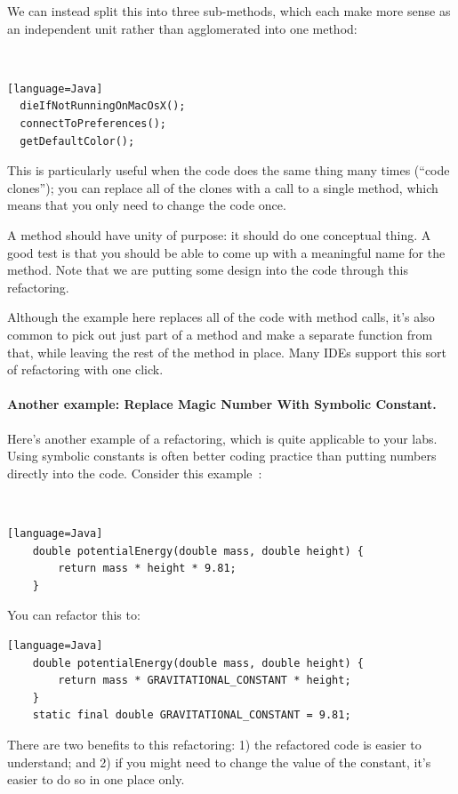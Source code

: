 We can instead split this into three sub-methods, which each make more
sense as an independent unit rather than agglomerated into one method:

{\tt
\begin{verbatim}[language=Java]
  dieIfNotRunningOnMacOsX();
  connectToPreferences();
  getDefaultColor();
\end{verbatim}
}

This is particularly useful when the code does the same thing 
many times (``code clones''); you can replace all of the clones with
a call to a single method, which means that you only need to change the
code once. 

A method should have unity of purpose: it should do one
conceptual thing. A good test is that you should be able to come up
with a meaningful name for the method. Note that we are putting some
design into the code through this refactoring.

Although the example here replaces all of the code with method calls,
it's also common to pick out just part of a method and make a separate
function from that, while leaving the rest of the method in
place. Many IDEs support this sort of refactoring with one click.

\paragraph{Another example: Replace Magic Number With Symbolic Constant.}
Here's another example of a refactoring, which is quite applicable to
your labs. Using symbolic constants is often better coding practice
than putting numbers directly into the code. Consider this example~\cite{ref:repconst}:

{\tt
\begin{verbatim}[language=Java]
	double potentialEnergy(double mass, double height) {
		return mass * height * 9.81;
	}
\end{verbatim}}

You can refactor this to:
{\tt \begin{verbatim}[language=Java]
	double potentialEnergy(double mass, double height) {
		return mass * GRAVITATIONAL_CONSTANT * height;
	}
	static final double GRAVITATIONAL_CONSTANT = 9.81;
\end{verbatim}}
\vspace{-1em}
There are two benefits to this refactoring: 1) the refactored code is
easier to understand; and 2) if you might need to change the value of 
the constant, it's easier to do so in one place only.
\vspace{-1em}

